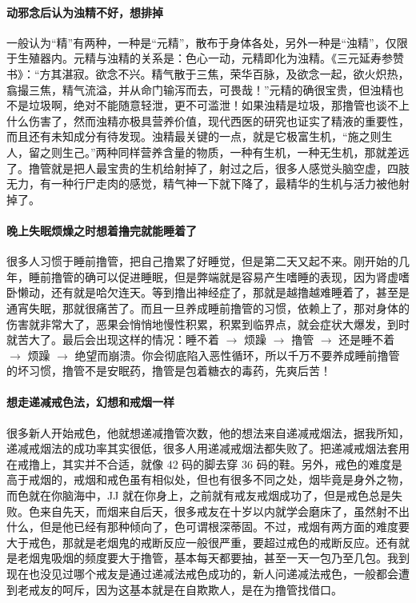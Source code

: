 \paragraph{动邪念后认为浊精不好，想排掉} 一般认为“精”有两种，一种是“元精”，散布于身体各处，另外一种是“浊精”，仅限于生殖器内。元精与浊精的关系是：色心一动，元精即化为浊精。《三元延寿参赞书》：“方其湛寂。欲念不兴。精气散于三焦，荣华百脉，及欲念一起，欲火炽热，翕撮三焦，精气流溢，并从命门输泻而去，可畏哉！”元精的确很宝贵，但浊精也不是垃圾啊，绝对不能随意轻泄，更不可滥泄！如果浊精是垃圾，那撸管也谈不上什么伤害了，然而浊精亦极具营养价值，现代西医的研究也证实了精液的重要性，而且还有未知成分有待发现。浊精最关键的一点，就是它极富生机，“施之则生人，留之则生己。”两种同样营养含量的物质，一种有生机，一种无生机，那就差远了。撸管就是把人最宝贵的生机给射掉了，射过之后，很多人感觉头脑空虚，四肢无力，有一种行尸走肉的感觉，精气神一下就下降了，最精华的生机与活力被他射掉了。

\paragraph{晚上失眠烦燥之时想着撸完就能睡着了} 很多人习惯于睡前撸管，把自己撸累了好睡觉，但是第二天又起不来。刚开始的几年，睡前撸管的确可以促进睡眠，但是弊端就是容易产生嗜睡的表现，因为肾虚嗜卧懒动，还有就是哈欠连天。等到撸出神经症了，那就是越撸越难睡着了，甚至是通宵失眠，那就很痛苦了。而且一旦养成睡前撸管的习惯，依赖上了，那对身体的伤害就非常大了，恶果会悄悄地慢性积累，积累到临界点，就会症状大爆发，到时就苦大了。最后会出现这样的情况：睡不着 $\to$ 烦躁 $\to$ 撸管 $\to$ 还是睡不着 $\to$ 烦躁 $\to$ 绝望而崩溃。你会彻底陷入恶性循环，所以千万不要养成睡前撸管的坏习惯，撸管不是安眠药，撸管是包着糖衣的毒药，先爽后苦！

\paragraph{想走递减戒色法，幻想和戒烟一样} 很多新人开始戒色，他就想递减撸管次数，他的想法来自递减戒烟法，据我所知，递减戒烟法的成功率其实很低，很多人用递减戒烟法都失败了。把递减戒烟法套用在戒撸上，其实并不合适，就像 42 码的脚去穿 36 码的鞋。另外，戒色的难度是高于戒烟的，戒烟和戒色虽有相似处，但也有很多不同之处，烟毕竟是身外之物，而色就在你脑海中，JJ 就在你身上，之前就有戒友戒烟成功了，但是戒色总是失败。色来自先天，而烟来自后天，很多戒友在十岁以内就学会磨床了，虽然射不出什么，但是他已经有那种倾向了，色可谓根深蒂固。不过，戒烟有两方面的难度要大于戒色，那就是老烟鬼的戒断反应一般很严重，要超过戒色的戒断反应。还有就是老烟鬼吸烟的频度要大于撸管，基本每天都要抽，甚至一天一包乃至几包。我到现在也没见过哪个戒友是通过递减法戒色成功的，新人问递减法戒色，一般都会遭到老戒友的呵斥，因为这基本就是在自欺欺人，是在为撸管找借口。

